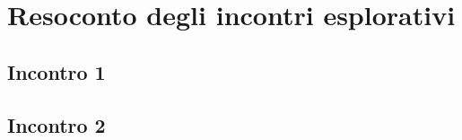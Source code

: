 \section{Resoconto degli incontri esplorativi}
\subsection{Incontro 1}



\subsection{Incontro 2}


